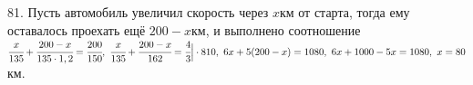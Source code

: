 81. Пусть автомобиль увеличил скорость через $x$км от старта, тогда ему оставалось проехать ещё $200-x$км, и выполнено соотношение
$\cfrac{x}{135}+\cfrac{200-x}{135\cdot1,2}=\cfrac{200}{150},\
\cfrac{x}{135}+\cfrac{200-x}{162}=\cfrac{4}{3}\Big|\cdot 810,\
6x+5(200-x)=1080,\ 6x+1000-5x=1080,\ x=80$км.
\newpage
